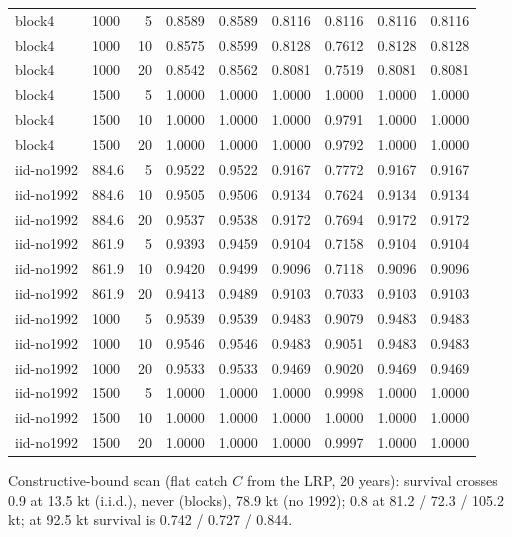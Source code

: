 \documentclass[11pt,a4paper]{article}
\begin{document}
\begin{longtable}{llrrrrrrr}
block4 & 1000 & 5 & 0.8589 & 0.8589 & 0.8116 & 0.8116 & 0.8116 & 0.8116 \\
block4 & 1000 & 10 & 0.8575 & 0.8599 & 0.8128 & 0.7612 & 0.8128 & 0.8128 \\
block4 & 1000 & 20 & 0.8542 & 0.8562 & 0.8081 & 0.7519 & 0.8081 & 0.8081 \\
block4 & 1500 & 5 & 1.0000 & 1.0000 & 1.0000 & 1.0000 & 1.0000 & 1.0000 \\
block4 & 1500 & 10 & 1.0000 & 1.0000 & 1.0000 & 0.9791 & 1.0000 & 1.0000 \\
block4 & 1500 & 20 & 1.0000 & 1.0000 & 1.0000 & 0.9792 & 1.0000 & 1.0000 \\
iid-no1992 & 884.6 & 5 & 0.9522 & 0.9522 & 0.9167 & 0.7772 & 0.9167 & 0.9167 \\
iid-no1992 & 884.6 & 10 & 0.9505 & 0.9506 & 0.9134 & 0.7624 & 0.9134 & 0.9134 \\
iid-no1992 & 884.6 & 20 & 0.9537 & 0.9538 & 0.9172 & 0.7694 & 0.9172 & 0.9172 \\
iid-no1992 & 861.9 & 5 & 0.9393 & 0.9459 & 0.9104 & 0.7158 & 0.9104 & 0.9104 \\
iid-no1992 & 861.9 & 10 & 0.9420 & 0.9499 & 0.9096 & 0.7118 & 0.9096 & 0.9096 \\
iid-no1992 & 861.9 & 20 & 0.9413 & 0.9489 & 0.9103 & 0.7033 & 0.9103 & 0.9103 \\
iid-no1992 & 1000 & 5 & 0.9539 & 0.9539 & 0.9483 & 0.9079 & 0.9483 & 0.9483 \\
iid-no1992 & 1000 & 10 & 0.9546 & 0.9546 & 0.9483 & 0.9051 & 0.9483 & 0.9483 \\
iid-no1992 & 1000 & 20 & 0.9533 & 0.9533 & 0.9469 & 0.9020 & 0.9469 & 0.9469 \\
iid-no1992 & 1500 & 5 & 1.0000 & 1.0000 & 1.0000 & 0.9998 & 1.0000 & 1.0000 \\
iid-no1992 & 1500 & 10 & 1.0000 & 1.0000 & 1.0000 & 1.0000 & 1.0000 & 1.0000 \\
iid-no1992 & 1500 & 20 & 1.0000 & 1.0000 & 1.0000 & 0.9997 & 1.0000 & 1.0000 \\
\end{longtable}
\par\noindent\begin{minipage}{0.97\linewidth}\footnotesize Constructive-bound scan (flat catch $C$ from the LRP, 20 years): survival crosses 0.9 at 13.5 kt (i.i.d.), never (blocks), 78.9 kt (no 1992); 0.8 at 81.2 / 72.3 / 105.2 kt; at 92.5 kt survival is 0.742 / 0.727 / 0.844.\end{minipage}
\endgroup
\end{document}
